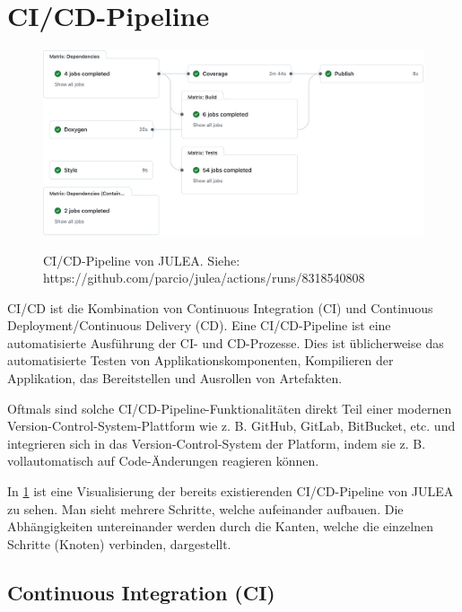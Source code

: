 \section{CI/CD-Pipeline} \label{sec:ci-cd-pipeline}

\begin{figure}[H]
    \includegraphics[width=\textwidth]{./figures/ci-julea-exmaple-full.png}
    \label{fig:ci-cd-julea-example-full}
    \caption{CI/CD-Pipeline von JULEA. \newline
        Siehe: https://github.com/parcio/julea/actions/runs/8318540808}
\end{figure}

CI/CD ist die Kombination von Continuous Integration (CI) und Continuous Deployment/Continuous Delivery (CD). Eine CI/CD-Pipeline ist eine automatisierte Ausführung der CI- und CD-Prozesse. Dies ist üblicherweise das automatisierte Testen von Applikationskomponenten, Kompilieren der Applikation, das Bereitstellen und Ausrollen von Artefakten. 

Oftmals sind solche CI/CD-Pipeline-Funktionalitäten direkt Teil einer modernen Version-Control-System-Plattform wie z. B. GitHub, GitLab, BitBucket, etc. und integrieren sich in das Version-Control-System der Platform, indem sie z. B. vollautomatisch auf Code-Änderungen reagieren können. 

In \cref{fig:ci-cd-julea-example-full} ist eine Visualisierung der bereits existierenden CI/CD-Pipeline von JULEA zu sehen. Man sieht mehrere Schritte, welche aufeinander aufbauen. Die Abhängigkeiten untereinander werden durch die Kanten, welche die einzelnen Schritte (Knoten) verbinden, dargestellt.


\pagebreak

\subsection{Continuous Integration (CI)}


